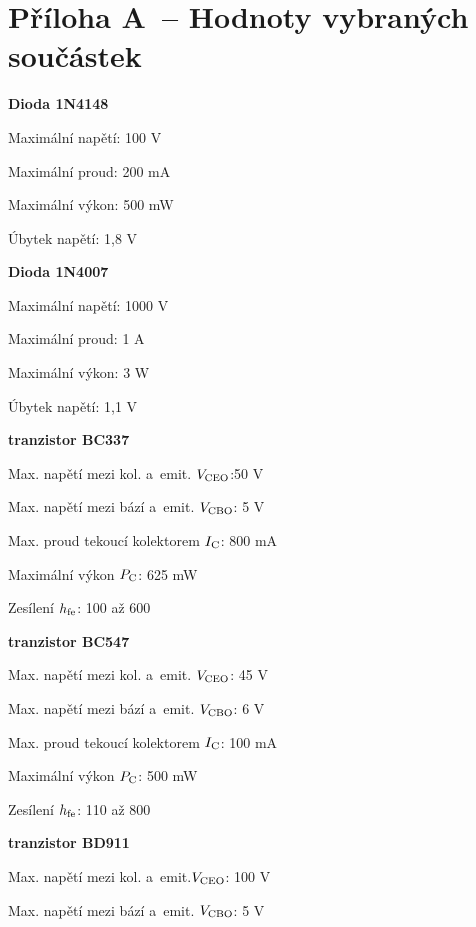 \section*{Příloha A~-- Hodnoty vybraných součástek}


\hypertarget{1N4148}{}
{\bf Dioda 1N4148}  

Maximální napětí: 100 V

Maximální proud: 200 mA

Maximální výkon:  500 mW

Úbytek napětí: 1,8 V

\vskip 2mm

\hypertarget{1N4007}{}
{\bf Dioda 1N4007} 

Maximální napětí: 1000 V

Maximální proud: 1 A

Maximální výkon: 3 W

Úbytek napětí: 1,1 V

\vskip 2mm

\hypertarget{BCC337}{}
{\bf tranzistor BC337} 

Max. napětí mezi kol. a~emit. $V \rm _{CEO}$:50 V

Max. napětí mezi bází a~emit. $V \rm _{CBO}$: 5 V

Max. proud tekoucí kolektorem $I \rm _C$: 800 mA

Maximální výkon $ P \rm _C$: 625 mW

Zesílení $ h \rm _{fe}$: 100 až 600

\vskip 2mm

\hypertarget{BCC547}{}
{\bf tranzistor BC547} 

Max. napětí mezi kol. a~emit. $ V \rm_{CEO}$: 45 V

Max. napětí mezi bází a~emit. $ V \rm _{CBO}$: 6 V
 
Max. proud tekoucí kolektorem $ I \rm _C$: 100 mA

Maximální výkon $P \rm _C$: 500 mW

Zesílení $h \rm _{fe}$: 110 až 800

\vskip 2mm

\hypertarget{BD911}{}
{\bf tranzistor BD911}  

Max. napětí mezi kol. a~emit.$V \rm _{CEO}$: 100 V

Max. napětí mezi bází a~emit. $V \rm _{CBO}$: 5 V

